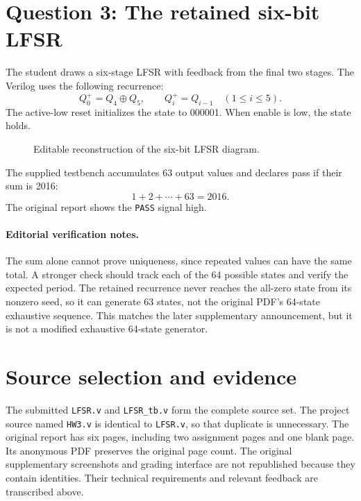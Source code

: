 \documentclass[11pt,a4paper]{article}
\newcommand{\bits}[1]{\texttt{#1}}
\begin{document}
\section{Question 3: The retained six-bit LFSR}
The student draws a six-stage LFSR with feedback from the final two stages. The Verilog uses the following recurrence:
\[
Q_0^+=Q_4\oplus Q_5,\qquad Q_i^+=Q_{i-1}\quad(1\le i\le5).
\]
The active-low reset initializes the state to 000001. When enable is low, the state holds.
\begin{figure}[ht]\centering
{}
\caption{Editable reconstruction of the six-bit LFSR diagram.}
\end{figure}
The supplied testbench accumulates 63 output values and declares pass if their sum is 2016:
\[
1+2+\cdots+63=2016.
\]
The original report shows the \bits{PASS} signal high.
\paragraph{Editorial verification notes.}
The sum alone cannot prove uniqueness, since repeated values can have the same total. A stronger check should track each of the 64 possible states and verify the expected period.
The retained recurrence never reaches the all-zero state from its nonzero seed, so it can generate 63 states, not the original PDF's 64-state exhaustive sequence. This matches the later supplementary announcement, but it is not a modified exhaustive 64-state generator.

\section{Source selection and evidence}
The submitted \bits{LFSR.v} and \bits{LFSR\_tb.v} form the complete source set. The project source named \bits{HW3.v} is identical to \bits{LFSR.v}, so that duplicate is unnecessary. The original report has six pages, including two assignment pages and one blank page. Its anonymous PDF preserves the original page count. The original supplementary screenshots and grading interface are not republished because they contain identities. Their technical requirements and relevant feedback are transcribed above.
\end{document}
